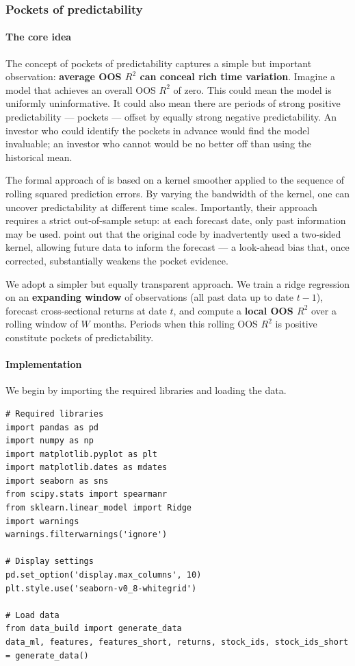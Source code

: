 \subsubsection{Pockets of predictability}\label{sec_pred_pockets}

\paragraph{The core idea}

The concept of pockets of predictability captures a simple but important observation: \textbf{average OOS $R^2$ can conceal rich time variation}. Imagine a model that achieves an overall OOS $R^2$ of zero. This could mean the model is uniformly uninformative. It could also mean there are periods of strong positive predictability --- pockets --- offset by equally strong negative predictability. An investor who could identify the pockets in advance would find the model invaluable; an investor who cannot would be no better off than using the historical mean.

The formal approach of \cite{farmer2019pockets} is based on a kernel smoother applied to the sequence of rolling squared prediction errors. By varying the bandwidth of the kernel, one can uncover predictability at different time scales. Importantly, their approach requires a strict out-of-sample setup: at each forecast date, only past information may be used. \cite{cakici2025pockets} point out that the original code by \cite{farmer2019pockets} inadvertently used a two-sided kernel, allowing future data to inform the forecast --- a look-ahead bias that, once corrected, substantially weakens the pocket evidence.

We adopt a simpler but equally transparent approach. We train a ridge regression on an \textbf{expanding window} of observations (all past data up to date $t -1$), forecast cross-sectional returns at date $t$, and compute a \textbf{local OOS $R^2$} over a rolling window of $W$ months. Periods when this rolling OOS $R^2$ is positive constitute pockets of predictability.

\paragraph{Implementation}

We begin by importing the required libraries and loading the data.

\begin{verbatim}
# Required libraries
import pandas as pd
import numpy as np
import matplotlib.pyplot as plt
import matplotlib.dates as mdates
import seaborn as sns
from scipy.stats import spearmanr
from sklearn.linear_model import Ridge
import warnings
warnings.filterwarnings('ignore')

# Display settings
pd.set_option('display.max_columns', 10)
plt.style.use('seaborn-v0_8-whitegrid')

# Load data
from data_build import generate_data
data_ml, features, features_short, returns, stock_ids, stock_ids_short = generate_data()
\end{verbatim}

